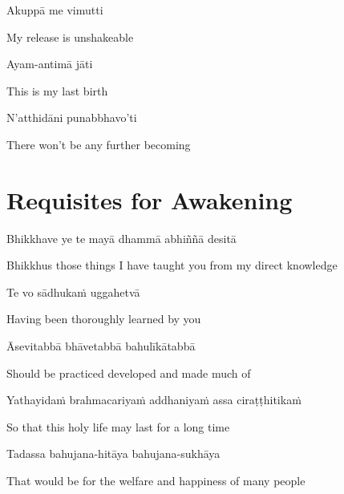 Akuppā me vimutti

\begin{cprenglish}
  My release is unshakeable
\end{cprenglish}

Ayam-antimā jāti

\begin{cprenglish}
  This is my last birth
\end{cprenglish}

N’atthidāni punabbhavo’ti

\begin{cprenglish}
  There won’t be any further becoming
\end{cprenglish}

\suttaRef{[SN 56.11]}

\clearpage

\section{Requisites for Awakening}

\begin{leader}
\end{leader}

Bhikkhave ye te mayā dhammā abhiññā desitā

\begin{cprenglish}
  Bhikkhus those things I have taught you from my direct knowledge
\end{cprenglish}

Te vo sādhukaṁ uggahetvā

\begin{cprenglish}
  Having been thoroughly learned by you
\end{cprenglish}

Āsevitabbā bhāvetabbā bahulīkātabbā

\begin{cprenglish}
  Should be practiced developed and made much of
\end{cprenglish}

Yathayidaṁ brahmacariyaṁ addhaniyaṁ assa ciraṭṭhitikaṁ

\begin{cprenglish}
  So that this holy life may last for a long time
\end{cprenglish}

Tadassa bahujana-hitāya bahujana-sukhāya

\begin{cprenglish}
  That would be for the welfare and happiness of many people
\end{cprenglish}

